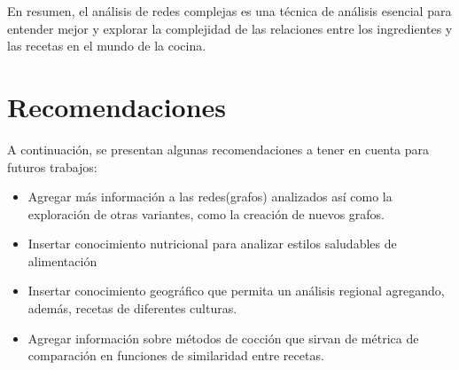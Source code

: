 \documentclass[a4paper]{article}
\begin{document}
En resumen, el análisis de redes complejas es una técnica de análisis esencial
para entender mejor y explorar la complejidad de las relaciones entre los
ingredientes y las recetas en el mundo de la cocina.


\section{Recomendaciones}\label{sec:rec}

A continuación, se presentan algunas recomendaciones a tener en cuenta para
futuros trabajos:
\begin{itemize}
	\item Agregar más información a las redes(grafos) analizados así como la
	exploración de otras variantes, como la creación de nuevos grafos.
	\item Insertar conocimiento nutricional para analizar estilos saludables de
	alimentación
	\item Insertar conocimiento geográfico que permita un análisis regional
	agregando, además, recetas de diferentes culturas.
	\item Agregar información sobre métodos de cocción que sirvan de métrica de
	comparación en funciones de similaridad entre recetas.
\end{itemize}








\label{end}
\end{document}
